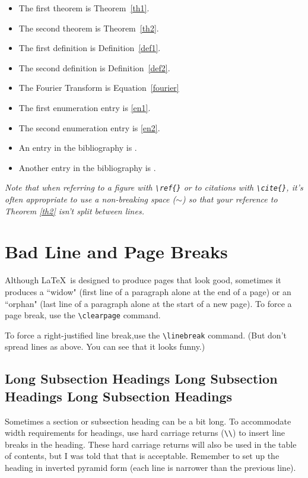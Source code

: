 \begin{itemize}
\item
The first theorem is Theorem~\ref{th1}.

\item
The second theorem is Theorem~\ref{th2}.

\item
The first definition is Definition~\ref{def1}.

\item
The second definition is Definition~\ref{def2}.

\item
The Fourier Transform is Equation~\ref{fourier}

\item
The first enumeration entry is \ref{en1}.

\item
The second enumeration entry is \ref{en2}.

\item
An entry in the bibliography is \cite{bib1}.

\item
Another entry in the bibliography is \cite{bib2}.

\end{itemize}

{\em Note that when referring to a figure with \verb+\ref{}+ or to
citations with \verb+\cite{}+, it's often appropriate to use a
non-breaking space ($\sim$) so that your reference to Theorem \ref{th2} isn't split between lines.
}


\section{Bad Line and Page Breaks}

Although \LaTeX \ is designed to produce pages that look good,
sometimes it produces a ``widow" (first line of a paragraph
alone at the end of a page) or an ``orphan"
(last line of a paragraph alone at the start of a new page).
To force a page break, use the
\verb+\clearpage+ command.

To force a right-justified line break,\linebreak use the
\verb+\linebreak+ command.
(But don't spread lines as above. You can see that it looks funny.)



\subsection{Long Subsection Headings 
Long Subsection \\
Headings 
Long Subsection Headings
}


Sometimes a section or subsection heading can be a bit long.
To accommodate width requirements for headings, 
use hard carriage returns (\verb+\\+)
to insert line breaks in the heading. These hard carriage returns 
will also be used in the table of contents, but 
I was told that that is acceptable. 
Remember to set up the heading in inverted pyramid form
(each line is narrower than the previous line).


